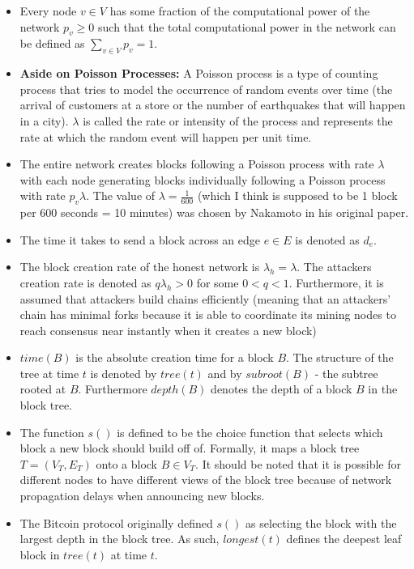 \documentclass[a4paper]{article}
\begin{document}
\begin{itemize}
\begin{itemize}
\item Every node $v \in V$ has some fraction of the computational power of the network $p_v \ge 0$ such that the total computational power in the network can be defined as $\sum_{v\in V}p_v = 1$.

\item \textbf{Aside on Poisson Processes:} A Poisson process is a type of counting process that tries to model the occurrence of random events over time (the arrival of customers at a store or the number of earthquakes that will happen in a city). $\lambda$ is called the rate or intensity of the process and represents the rate at which the random event will happen per unit time.

\item The entire network creates blocks following a Poisson process with rate $\lambda$ with each node generating blocks individually following a Poisson process with rate $p_v \lambda$. The value of $\lambda = \frac{1}{600}$ (which I think is supposed to be 1 block per 600 seconds = 10 minutes) was chosen by Nakamoto in his original paper.

\item The time it takes to send a block across an edge $e \in E$ is denoted as $d_e$.

\item The block creation rate of the honest network is $\lambda_h = \lambda$. The attackers creation rate is denoted as $q\lambda_h > 0$ for some $0 < q < 1$. Furthermore, it is assumed that attackers build chains efficiently (meaning that an attackers' chain has minimal forks because it is able to coordinate its mining nodes to reach consensus near instantly when it creates a new block)

\item $time(B)$ is the absolute creation time for a block $B$. The structure of the tree at time $t$ is denoted by $tree(t)$ and by $subroot(B)$ - the subtree rooted at $B$. Furthermore $depth(B)$ denotes the depth of a block $B$ in the block tree.

\item The function $s()$ is defined to be the choice function that selects which block a new block should build off of. Formally, it maps a block tree $T = (V_T, E_T)$ onto a block $B \in V_T$. It should be noted that it is possible for different nodes to have different views of the block tree because of network propagation delays when announcing new blocks.

\item The Bitcoin protocol originally defined $s()$ as selecting the block with the largest depth in the block tree. As such, $longest(t)$ defines the deepest leaf block in $tree(t)$ at time $t$.


\end{itemize}
\end{itemize}
\end{document}
